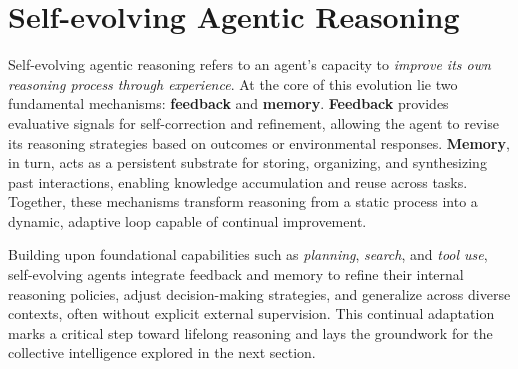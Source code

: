 \section{Self-evolving Agentic Reasoning}
\label{sec:selfevolve}

Self-evolving agentic reasoning refers to an agent’s capacity to \emph{improve its own reasoning process through experience}. 
At the core of this evolution lie two fundamental mechanisms: \textbf{feedback} and \textbf{memory}. 
\textbf{Feedback} provides evaluative signals for self-correction and refinement, allowing the agent to revise its reasoning strategies based on outcomes or environmental responses. 
\textbf{Memory}, in turn, acts as a persistent substrate for storing, organizing, and synthesizing past interactions, enabling knowledge accumulation and reuse across tasks. 
Together, these mechanisms transform reasoning from a static process into a dynamic, adaptive loop capable of continual improvement.

Building upon foundational capabilities such as \emph{planning}, \emph{search}, and \emph{tool use}, self-evolving agents integrate feedback and memory to refine their internal reasoning policies, adjust decision-making strategies, and generalize across diverse contexts, often without explicit external supervision. 
This continual adaptation marks a critical step toward lifelong reasoning and lays the groundwork for the collective intelligence explored in the next section.





